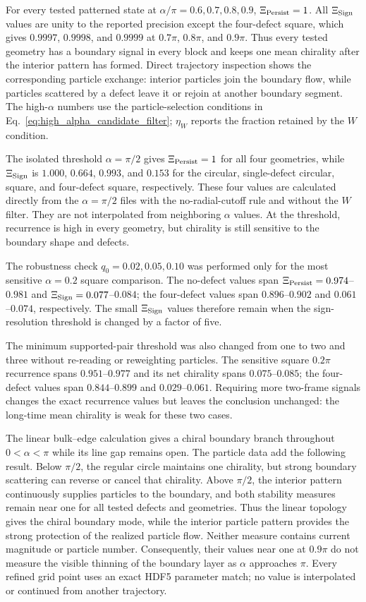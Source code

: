 \documentclass[11pt]{article}
\numberwithin{equation}{section}
\begin{document}
For every tested patterned state at
$\alpha/\pi=0.6,0.7,0.8,0.9$, $\Xi_{\rm Persist}=1$.  All
$\Xi_{\rm Sign}$ values are unity to the reported precision except the four-defect square,
which gives $0.9997$, $0.9998$, and $0.9999$ at $0.7\pi$, $0.8\pi$, and
$0.9\pi$.  Thus every tested geometry has a boundary signal in every block and
keeps one mean chirality after the interior pattern has formed.  Direct
trajectory inspection shows the corresponding particle exchange: interior
particles join the boundary flow, while particles scattered by a defect leave
it or rejoin at another boundary segment.  The high-$\alpha$ numbers use the
particle-selection conditions in Eq.~\eqref{eq:high_alpha_candidate_filter};
$\eta_W$ reports the fraction retained by the $W$ condition.

The isolated threshold $\alpha=\pi/2$ gives $\Xi_{\rm Persist}=1$ for all four
geometries, while $\Xi_{\rm Sign}$ is $1.000$, $0.664$, $0.993$, and $0.153$
for the circular, single-defect circular, square, and four-defect square,
respectively.  These four values are calculated directly from the
$\alpha=\pi/2$ files with the no-radial-cutoff rule and without the $W$ filter.
They are not interpolated from neighboring $\alpha$ values.  At the threshold,
recurrence is high in every geometry, but chirality is still sensitive to the
boundary shape and defects.

The robustness check $q_0=0.02,0.05,0.10$ was performed only for the most
sensitive $\alpha=0.2$ square comparison.  The no-defect values span
$\Xi_{\rm Persist}=0.974$--$0.981$ and
$\Xi_{\rm Sign}=0.077$--$0.084$; the four-defect values span
$0.896$--$0.902$ and $0.061$--$0.074$, respectively.  The small
$\Xi_{\rm Sign}$ values therefore remain when the sign-resolution threshold is
changed by a factor of five.

The minimum supported-pair threshold was also changed from one to two and
three without re-reading or reweighting particles.  The sensitive square
$0.2\pi$ recurrence spans $0.951$--$0.977$ and its net chirality spans
$0.075$--$0.085$; the four-defect values span $0.844$--$0.899$ and
$0.029$--$0.061$.  Requiring more two-frame signals changes the exact
recurrence values but leaves the conclusion unchanged: the long-time mean
chirality is weak for these two cases.

The linear bulk--edge calculation gives a chiral boundary branch throughout
$0<\alpha<\pi$ while its line gap remains open.  The particle data add the
following result.  Below $\pi/2$, the regular circle maintains one chirality,
but strong boundary scattering can reverse or cancel that chirality.  Above
$\pi/2$, the interior pattern continuously supplies particles to the boundary,
and both stability measures remain near one for all tested defects and
geometries.  Thus the linear topology gives the chiral boundary mode, while the
interior particle pattern provides the strong protection of the realized
particle flow.  Neither measure contains current magnitude or particle number.
Consequently, their values near one at $0.9\pi$ do not measure the visible
thinning of the boundary layer as $\alpha$ approaches $\pi$.  Every refined
grid point uses an exact HDF5 parameter match; no value is interpolated or
continued from another trajectory.
\end{document}
